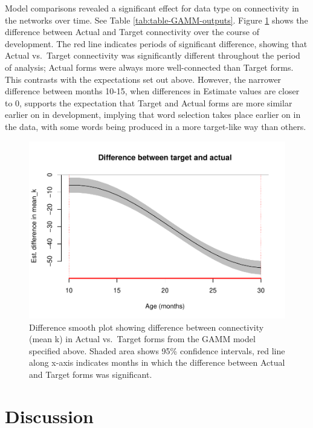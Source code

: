 \documentclass[
  man]{apa6}
\begin{document}
Model comparisons revealed a significant effect for data type on connectivity in the networks over time. See Table \ref{tab:table-GAMM-outputs}. Figure \ref{fig:difference-plot-mean-k} shows the difference between Actual and Target connectivity over the course of development. The red line indicates periods of significant difference, showing that Actual vs.~Target connectivity was significantly different throughout the period of analysis; Actual forms were always more well-connected than Target forms. This contrasts with the expectations set out above. However, the narrower difference between months 10-15, when differences in Estimate values are closer to 0, supports the expectation that Target and Actual forms are more similar earlier on in development, implying that word selection takes place earlier on in the data, with some words being produced in a more target-like way than others.

\begin{figure}
\centering
\includegraphics{NetworkGraphs_files/figure-latex/difference-plot-mean-k-1.pdf}
\caption{\label{fig:difference-plot-mean-k}Difference smooth plot showing difference between connectivity (mean k) in Actual vs.~Target forms from the GAMM model specified above. Shaded area shows 95\% confidence intervals, red line along x-axis indicates months in which
the difference between Actual and Target forms was significant.}
\end{figure}

\hypertarget{discussion}{%
\section*{Discussion}\label{discussion}}
\end{document}
